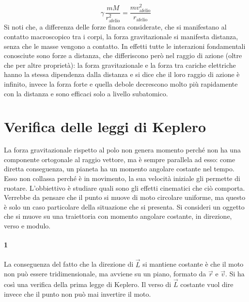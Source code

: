 \documentclass[10pt,a4paper]{book}
\begin{document}
\[
	\gamma\,\frac{mM}{r_\text{afelio}^2}=\frac{mv_\text{afelio}^2}{r_\text{afelio}}
\]
Si noti che, a differenza delle forze finora considerate, che si manifestano al contatto macroscopico tra i corpi, la forza gravitazionale si manifesta distanza, senza che le masse vengono a contatto. In effetti tutte le interazioni fondamentali conosciute sono forze a distanza, che differiscono però nel raggio di azione (oltre che per altre proprietà): la forza gravitazionale e la forza tra cariche elettriche hanno la stessa dipendenza dalla distanza e si dice che il loro raggio di azione è infinito, invece la forza forte e quella debole decrescono molto più rapidamente con la distanza e sono efficaci solo a livello subatomico.







































\section{Verifica delle leggi di Keplero}

La forza gravitazionale rispetto al polo non genera momento perché non ha una componente ortogonale al raggio vettore, ma è sempre parallela ad esso: come diretta conseguenza, un pianeta ha un momento angolare costante nel tempo. Esso non collassa perché è in movimento, la sua velocità iniziale gli permette di ruotare. L'obbiettivo è studiare quali sono gli effetti cinematici che ciò comporta. Verrebbe da pensare che il punto si muove di moto circolare uniforme, ma questo è solo un caso particolare della situazione che si presenta.
Si consideri un oggetto che si muove su una traiettoria con momento angolare costante, in direzione, verso e modulo.

\paragraph{1} La conseguenza del fatto che la direzione di $\vec{L}$ si mantiene costante è che il moto non può essere tridimensionale, ma avviene su un piano, formato da $\vec{r}$ e $\vec{v}$. Si ha così una verifica della prima legge di Keplero. Il verso di $\vec{L}$ costante vuol dire invece che il punto non può mai invertire il moto.
\end{document}
